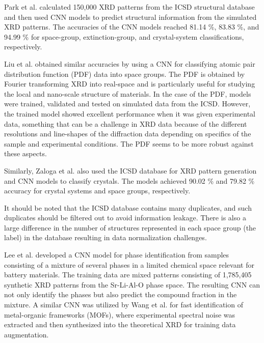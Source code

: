 \documentclass[pdflatex,sn-mathphys]{sn-jnl}%
\theoremstyle{thmstyleone}%
\theoremstyle{thmstyletwo}%
\theoremstyle{thmstylethree}%
\begin{document}
Park et al. \cite{parkClassificationCrystalStructure2017} calculated 150,000 XRD patterns from the ICSD structural database \cite{hellenbrandtInorganicCrystalStructure2004} and then used CNN models to predict structural information from the simulated XRD patterns. The accuracies of the CNN models reached 81.14 \%, 83.83 \%, and 94.99 \% for space-group, extinction-group, and crystal-system classifications, respectively.

Liu et al. \cite{liu2019using} obtained similar accuracies by using a CNN for classifying atomic pair distribution function (PDF) data into space groups. The PDF is obtained by Fourier transforming XRD into real-space and is particularly useful for studying the local and nano-scale structure of materials.  In the case of the PDF, models were trained, validated and tested on simulated data from the ICSD.  However, the trained model showed excellent performance when it was given experimental data, something that can be a challenge in XRD data because of the different resolutions and line-shapes of the diffraction data depending on specifics of the sample and experimental conditions.  The PDF seems to be more robust against these aspects.

Similarly, Zaloga et al. \cite{zalogaCrystalSymmetryClassification2020} also used the ICSD database for XRD pattern generation and CNN models to classify crystals. The models achieved 90.02 \% and 79.82 \% accuracy for crystal systems and space groups, respectively. 

It should be noted that the ICSD database contains many duplicates, and such duplicates should be filtered out to avoid information leakage. There is also a large difference in the number of structures represented in each space group (the label) in the database resulting in data normalization challenges.

Lee et al. \cite{leeDeeplearningTechniquePhase2020} developed a CNN model for phase identification from samples consisting of a mixture of several phases in a limited chemical space relevant for battery materials. The training data are mixed patterns consisting of 1,785,405 synthetic XRD patterns from the Sr-Li-Al-O phase space. The resulting CNN can not only identify the phases but also predict the compound fraction in the mixture. A similar CNN  was utilized by Wang et al. \cite{wangRapidIdentificationXray2020} for fast identification of metal-organic frameworks (MOFs), where experimental spectral noise was extracted and then synthesized into the theoretical XRD for training data augmentation.
\end{document}
